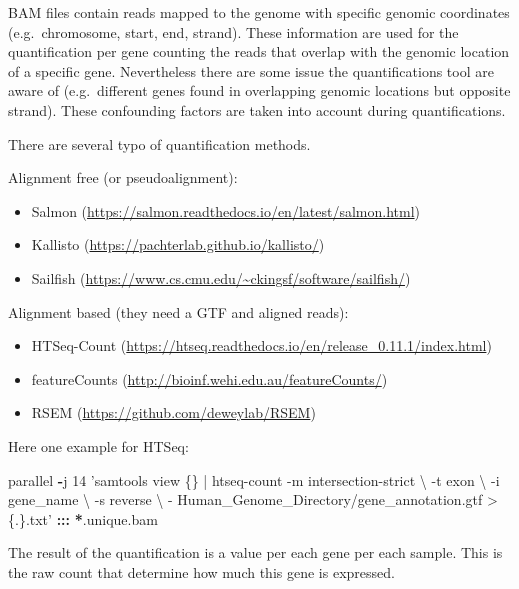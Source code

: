 \documentclass[]{book}
\newenvironment{Shaded}{\begin{snugshade}}{\end{snugshade}}
\newcommand{\DecValTok}[1]{\textcolor[rgb]{0.00,0.00,0.81}{#1}}
\newcommand{\ErrorTok}[1]{\textcolor[rgb]{0.64,0.00,0.00}{\textbf{#1}}}
\newcommand{\NormalTok}[1]{#1}
\newcommand{\OperatorTok}[1]{\textcolor[rgb]{0.81,0.36,0.00}{\textbf{#1}}}
\newcommand{\StringTok}[1]{\textcolor[rgb]{0.31,0.60,0.02}{#1}}
\begin{document}
BAM files contain reads mapped to the genome with specific genomic coordinates (e.g.~chromosome, start, end, strand). These information are used for the quantification per gene counting the reads that overlap with the genomic location of a specific gene. Nevertheless there are some issue the quantifications tool are aware of (e.g.~different genes found in overlapping genomic locations but opposite strand). These confounding factors are taken into account during quantifications.

There are several typo of quantification methods.

Alignment free (or pseudoalignment):

\begin{itemize}
\item
  Salmon (\url{https://salmon.readthedocs.io/en/latest/salmon.html})
\item
  Kallisto (\url{https://pachterlab.github.io/kallisto/})
\item
  Sailfish (\url{https://www.cs.cmu.edu/~ckingsf/software/sailfish/})
\end{itemize}

Alignment based (they need a GTF and aligned reads):

\begin{itemize}
\item
  HTSeq-Count (\url{https://htseq.readthedocs.io/en/release_0.11.1/index.html})
\item
  featureCounts (\url{http://bioinf.wehi.edu.au/featureCounts/})
\item
  RSEM (\url{https://github.com/deweylab/RSEM})
\end{itemize}

Here one example for HTSeq:

\begin{Shaded}
\begin{Highlighting}[]
\NormalTok{parallel }\OperatorTok{-}\NormalTok{j }\DecValTok{14} \StringTok{'samtools view \{\} | htseq-count -m intersection-strict \textbackslash{}}
\StringTok{-t exon \textbackslash{}}
\StringTok{-i gene_name \textbackslash{}}
\StringTok{-s reverse \textbackslash{}}
\StringTok{- Human_Genome_Directory/gene_annotation.gtf > \{.\}.txt'} \OperatorTok{:::}\StringTok{ }\ErrorTok{*}\NormalTok{.unique.bam}
\end{Highlighting}
\end{Shaded}

The result of the quantification is a value per each gene per each sample. This is the raw count that determine how much this gene is expressed.
\end{document}
